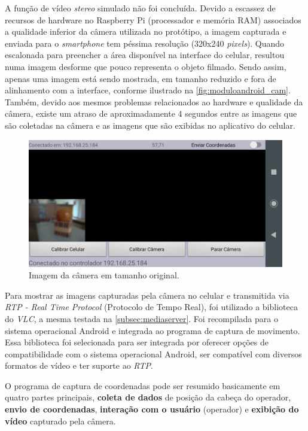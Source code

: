 A função de vídeo \textit{stereo} simulado não foi concluída. Devido a escassez de recursos de hardware no Raspberry Pi (processador e memória RAM) associados a qualidade inferior da câmera utilizada no protótipo, a imagem capturada e enviada para o \textit{smartphone} tem péssima resolução (320x240 \textit{pixels}). Quando escalonada para preencher a área disponível na interface do celular, resultou numa imagem desforme que pouco representa o objeto filmado. Sendo assim, apenas uma imagem está sendo mostrada, em tamanho reduzido e fora de alinhamento com a interface, conforme ilustrado na \autoref{fig:moduloandroid_cam}. Também, devido aos mesmos problemas relacionados ao hardware e qualidade da câmera, existe um atraso de aproximadamente 4 segundos entre as imagens que são coletadas na câmera e as imagens que são exibidas no aplicativo do celular.

\begin{figure}[H]
	\centering
	\includegraphics[width=1\textwidth]{figuras/modulo_android_2.png}
	\caption{Imagem da câmera em tamanho original.}
	\label{fig:moduloandroid_cam}
\end{figure}

Para mostrar as imagens capturadas pela câmera no celular e transmitida via \textit{RTP - Real Time Protocol} (Protocolo de Tempo Real), foi utilizado a biblioteca do \textit{VLC}, a mesma testada na \autoref{subsec:mediaserver}. Foi recompilada para o sistema operacional Android e integrada ao programa de captura de movimento. Essa biblioteca foi selecionada para ser integrada por oferecer opções de compatibilidade com o sistema operacional Android, ser compatível com diversos formatos de vídeo e ter suporte ao \textit{RTP}.\par

O programa de captura de coordenadas pode ser resumido basicamente em quatro partes principais, \textbf{coleta de dados} de posição da cabeça do operador, \textbf{envio de coordenadas}, \textbf{interação com o usuário} (operador) e \textbf{exibição do vídeo} capturado pela câmera.\par

